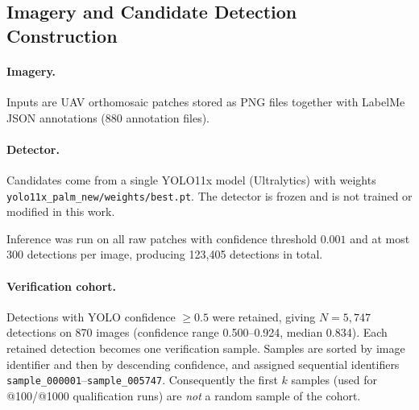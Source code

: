 \subsection{Imagery and Candidate Detection Construction}
\label{sec:method:detections}
\paragraph{Imagery.} Inputs are UAV orthomosaic patches stored as PNG files
together with LabelMe JSON annotations (880 annotation files).

\paragraph{Detector.} Candidates come from a single YOLO11x model
(Ultralytics) with weights \texttt{yolo11x\_palm\_new/weights/best.pt}. The
detector is frozen and is not trained or modified in this work.

Inference was run on all raw patches with confidence threshold $0.001$ and at
most 300 detections per image, producing 123{,}405 detections in total.

\paragraph{Verification cohort.} Detections with YOLO confidence
$\geq 0.5$ were retained, giving $N = 5{,}747$ detections on 870 images
(confidence range 0.500--0.924, median 0.834). Each retained detection becomes
one verification sample. Samples are sorted by image identifier and then by
descending confidence, and assigned sequential identifiers
\texttt{sample\_000001}--\texttt{sample\_005747}.
Consequently the first $k$ samples (used for @100/@1000 qualification runs) are
\emph{not} a random sample of the cohort.

